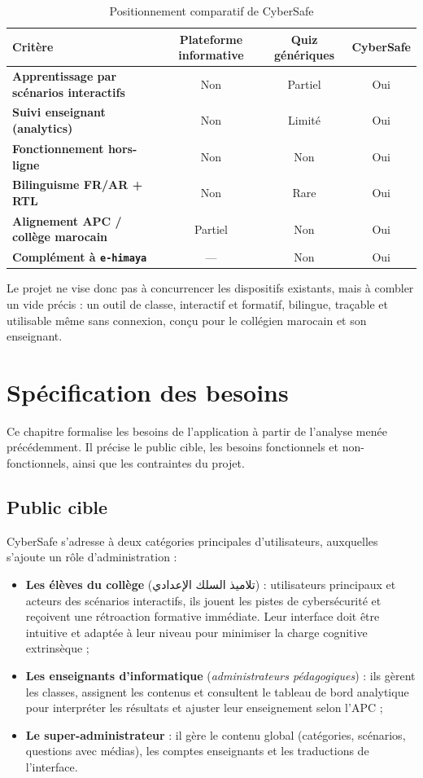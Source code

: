 \documentclass[12pt, a4paper, oneside]{report}
\begin{document}
\begin{table}[H]
\centering
\caption{Positionnement comparatif de CyberSafe}
\label{tab:positionnement}
\begin{tabularx}{\textwidth}{@{}>{\bfseries}l c c c@{}}
\toprule
Critère & Plateforme informative & Quiz génériques & CyberSafe \\
\midrule
Apprentissage par scénarios interactifs & Non & Partiel & Oui \\
Suivi enseignant (analytics) & Non & Limité & Oui \\
Fonctionnement hors-ligne & Non & Non & Oui \\
Bilinguisme FR/AR + RTL & Non & Rare & Oui \\
Alignement APC / collège marocain & Partiel & Non & Oui \\
Complément à \texttt{e-himaya} & --- & Non & Oui \\
\bottomrule
\end{tabularx}
\end{table}

Le projet ne vise donc pas à concurrencer les dispositifs existants, mais à combler un vide précis : un outil de classe, interactif et formatif, bilingue, traçable et utilisable même sans connexion, conçu pour le collégien marocain et son enseignant.

\chapter{Spécification des besoins}

Ce chapitre formalise les besoins de l'application à partir de l'analyse menée précédemment. Il précise le public cible, les besoins fonctionnels et non-fonctionnels, ainsi que les contraintes du projet.

\section{Public cible}
CyberSafe s'adresse à deux catégories principales d'utilisateurs, auxquelles s'ajoute un rôle d'administration :
\begin{itemize}[leftmargin=*]
  \item \textbf{Les élèves du collège} (\textarabic{تلاميذ السلك الإعدادي}) : utilisateurs principaux et acteurs des scénarios interactifs, ils jouent les pistes de cybersécurité et reçoivent une rétroaction formative immédiate. Leur interface doit être intuitive et adaptée à leur niveau pour minimiser la charge cognitive extrinsèque ;
  \item \textbf{Les enseignants d'informatique} (\textit{administrateurs pédagogiques}) : ils gèrent les classes, assignent les contenus et consultent le tableau de bord analytique pour interpréter les résultats et ajuster leur enseignement selon l'APC ;
  \item \textbf{Le super-administrateur} : il gère le contenu global (catégories, scénarios, questions avec médias), les comptes enseignants et les traductions de l'interface.
\end{itemize}
\end{document}
